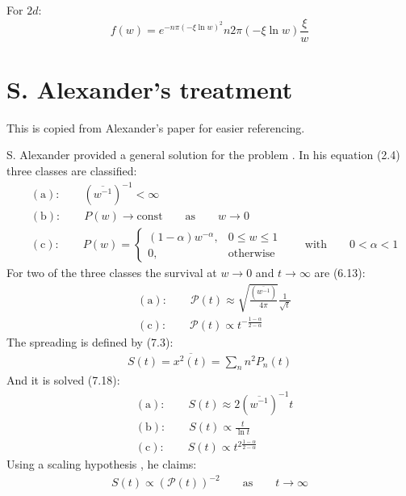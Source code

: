 \documentclass[onecolumn,fleqn]{revtex4}
\begin{document}
For $2d$:
\[ f(w) = e^{-n \pi (-\xi\ln w)^2} n 2\pi  (-\xi\ln w)\frac{\xi}{w}\]

\section{S. Alexander's treatment}
This is copied from Alexander's paper for easier referencing. 


S. Alexander provided a general solution for the problem \cite{Alexander:1981:RMP}. In his equation (2.4) three classes are classified:
\begin{align} 
    &\mathrm{(a) : }\qquad (\overline{w^{-1}})^{-1} < \infty  \\
    &\mathrm{(b) : }\qquad P(w)\rightarrow \mathrm{const} \qquad\mathrm{as}\qquad w \rightarrow 0 \\
    &\mathrm{(c) : }\qquad P(w) = 
        \begin{cases} 
            (1-\alpha)w^{-\alpha} , & 0\le w \le 1 \\
            0, & \mathrm{otherwise}
        \end{cases}
        \qquad\mathrm{with}\qquad 0<\alpha<1
\end{align}
For two of the three classes the survival at $w\rightarrow 0$ and $t\rightarrow \infty$ are (6.13):
\begin{align}
&\mathrm{(a) : }\qquad \mathcal{P}(t) \approx \sqrt{\frac{(\overline{w^{-1}})}{4\pi}}\frac{1}{\sqrt{t}}  \\
&\mathrm{(c) : }\qquad \mathcal{P}(t) \propto t^{-\frac{1-\alpha}{2-\alpha}}
\end{align}
The spreading is defined by (7.3):
\begin{align}\label{eq:spreading}
     S(t) = \overline{x^2(t)} = \sum_n n^2 P_n(t) 
\end{align}
And it is solved (7.18):
\begin{align}
    &\mathrm{(a) : }\qquad S(t) \approx 2(\overline{w^{-1}})^{-1}t  \\
    &\mathrm{(b) : }\qquad S(t) \propto \frac{t}{\ln t}  \\
    &\mathrm{(c) : }\qquad S(t) \propto t^{2\frac{1-\alpha}{2-\alpha}}
\end{align}
Using a scaling hypothesis , he claims:
\begin{align}\label{eq:scaling_hypo}
S(t) \propto \left(\mathcal{P}(t)\right)^{-2} \qquad \mathrm{as}\qquad t\rightarrow \infty
\end{align}
\end{document}
